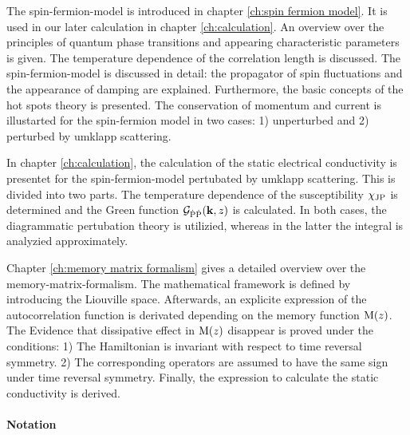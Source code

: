 The spin-fermion-model is introduced in chapter \ref{ch:spin fermion model}.
It is used in our later calculation in chapter \ref{ch:calculation}.
An overview over the principles of quantum phase transitions and appearing characteristic parameters is given.
The temperature dependence of the correlation length is discussed.
The spin-fermion-model is discussed in detail: the propagator of spin fluctuations and the appearance of damping are explained.
Furthermore, the basic concepts of the hot spots theory is presented.
The conservation of momentum and current is illustarted for the spin-fermion model in two cases:
1) unperturbed and 
2) perturbed by umklapp scattering.

In chapter \ref{ch:calculation}, the calculation of the static electrical conductivity is presentet for the spin-fermion-model pertubated by umklapp scattering.
This is divided into two parts.
The temperature dependence of the susceptibility $\chi_{\mathrm{JP}}$ is determined and the Green function $\mathcal{G}_{\dot{\mathrm{P}}\dot{\mathrm{P}}}(\vb{k},z)$ is calculated.
In both cases, the diagrammatic pertubation theory is utilizied, whereas in the latter the integral is analyzied approximately.

Chapter \ref{ch:memory matrix formalism} gives a detailed overview over the memory-matrix-formalism.
The mathematical framework is defined by introducing the Liouville space.
Afterwards, an explicite expression of the autocorrelation function is derivated depending on the memory function $\mathrm{M}(z)$.
The Evidence that dissipative effect in $\mathrm{M}(z)$ disappear is proved under the conditions: 
1) The Hamiltonian is invariant with respect to time reversal symmetry.
2) The corresponding operators are assumed to have the same sign under time reversal symmetry.
Finally, the expression to calculate the static conductivity is derived.

\paragraph{Notation}$\:$\vspace{3.5ex}

